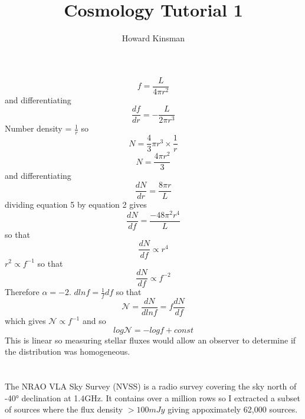 \documentclass[a4paper,12pt]{article}
\author{Howard Kinsman}
\title{Cosmology Tutorial 1}
\begin{document}
\maketitle

\section{}
\begin{equation}
f=\frac{L}{4\pi r^2}
\end{equation}
and differentiating
\begin{equation}
\frac{df}{dr}=-\frac{L}{2\pi r^3}
\end{equation}
Number density = $\frac{1}{r}$ so
\begin{equation}
N=\frac{4}{3}\pi r^3 \times \frac{1}{r}
\end{equation}
\begin{equation}
N=\frac{4\pi r^2}{3}
\end{equation}
and differentiating
\begin{equation}
\frac{dN}{dr}=\frac{8\pi r}{L}
\end{equation}
dividing equation 5 by equation 2 gives
\begin{equation}
\frac{dN}{df}=\frac{-48\pi^2 r^4}{L}
\end{equation}
so that
\begin{equation}
\frac{dN}{df}\propto r^4
\end{equation}
$r^2\propto f^{-1}$ so that
\begin{equation}
\frac{dN}{df}\propto f^{-2}
\end{equation}
Therefore $\alpha = -2$. 
$dln f=\frac{1}{f}df$ so that
\begin{equation}
\mathcal{N}=\frac{dN}{dln f}=f\frac{dN}{df}
\end{equation}
which gives $\mathcal{N}\propto f^{-1}$ and so
\begin{equation}
log\mathcal{N}=-log f + const
\end{equation}
This is linear so measuring stellar fluxes would allow an observer to determine if the distribution was homogeneous.

\section{}
The NRAO VLA Sky Survey (NVSS) is a radio survey covering the sky north of -40° declination at 1.4GHz. It contains over a million 
rows so I extracted a subset of sources where the flux density $>100mJy$ giving appoximately 62,000 sources.
\end{document}
